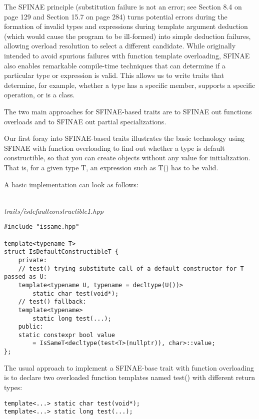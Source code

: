
The SFINAE principle (substitution failure is not an error; see Section 8.4 on page 129 and Section 15.7 on page 284) turns potential errors during the formation of invalid types and expressions during template argument deduction (which would cause the program to be ill-formed) into simple deduction failures, allowing overload resolution to select a different candidate. While originally intended to avoid spurious failures with function template overloading, SFINAE also enables remarkable compile-time techniques that can determine if a particular type or expression is valid. This allows us to write traits that determine, for example, whether a type has a specific member, supports a specific operation, or is a class. 

The two main approaches for SFINAE-based traits are to SFINAE out functions overloads and to SFINAE out partial specializations.


Our first foray into SFINAE-based traits illustrates the basic technology using SFINAE with function overloading to find out whether a type is default constructible, so that you can create objects without any value for initialization. That is, for a given type T, an expression such as T() has to be valid.

A basic implementation can look as follows:

\hspace*{\fill} \\ %
\noindent
\textit{traits/isdefaultconstructible1.hpp}
\begin{lstlisting}[style=styleCXX]
#include "issame.hpp"

template<typename T>
struct IsDefaultConstructibleT {
	private:
	// test() trying substitute call of a default constructor for T passed as U:
	template<typename U, typename = decltype(U())>
		static char test(void*);
	// test() fallback:
	template<typename>
		static long test(...);
	public:
	static constexpr bool value
		= IsSameT<decltype(test<T>(nullptr)), char>::value;
};
\end{lstlisting}

The usual approach to implement a SFINAE-base trait with function overloading is to declare two overloaded function templates named test() with different return types:

\begin{lstlisting}[style=styleCXX]
template<...> static char test(void*);
template<...> static long test(...);
\end{lstlisting}

